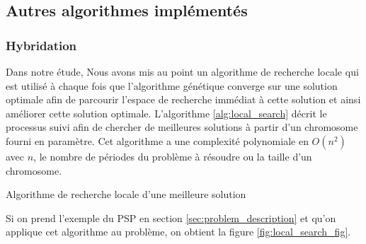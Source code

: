 	\subsection{Autres algorithmes implémentés}
	
	\subsubsection{Hybridation}
	\hspace*{.5cm} Dans notre étude, Nous avons mis au point un algorithme de recherche locale qui est utilisé à chaque fois que l'algorithme génétique converge sur une solution optimale afin de parcourir l'espace de recherche immédiat à cette solution et ainsi améliorer cette solution optimale. L'algorithme \ref{alg:local_search} décrit le processus suivi afin de chercher de meilleures solutions à partir d'un chromosome fourni en paramètre. Cet algorithme a une complexité polynomiale en $O(n^{2})$ avec $n$, le nombre de périodes du problème à résoudre ou la taille d'un chromosome.
	\\
	\begin{algorithm}[H]
		\label{alg:local_search}
 		\caption{Algorithme de recherche locale d'une meilleure solution}
 		\BlankLine
	\end{algorithm}
	\vspace*{.5cm}
	Si on prend l'exemple du PSP en section \ref{sec:problem_description} et qu'on applique cet algorithme au problème, on obtient la figure \ref{fig:local_search_fig}.
	
